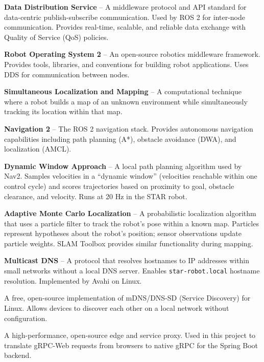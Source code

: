 \documentclass[11pt,letterpaper]{article}
\begin{document}
\begin{description}[style=nextline, leftmargin=2cm]
    \item[DDS] \textbf{Data Distribution Service} -- A middleware protocol and API standard for data-centric publish-subscribe communication. Used by ROS 2 for inter-node communication. Provides real-time, scalable, and reliable data exchange with Quality of Service (QoS) policies.

    \item[ROS 2] \textbf{Robot Operating System 2} -- An open-source robotics middleware framework. Provides tools, libraries, and conventions for building robot applications. Uses DDS for communication between nodes.

    \item[SLAM] \textbf{Simultaneous Localization and Mapping} -- A computational technique where a robot builds a map of an unknown environment while simultaneously tracking its location within that map.

    \item[Nav2] \textbf{Navigation 2} -- The ROS 2 navigation stack. Provides autonomous navigation capabilities including path planning (A*), obstacle avoidance (DWA), and localization (AMCL).

    \item[DWA] \textbf{Dynamic Window Approach} -- A local path planning algorithm used by Nav2. Samples velocities in a ``dynamic window'' (velocities reachable within one control cycle) and scores trajectories based on proximity to goal, obstacle clearance, and velocity. Runs at 20 Hz in the STAR robot.

    \item[AMCL] \textbf{Adaptive Monte Carlo Localization} -- A probabilistic localization algorithm that uses a particle filter to track the robot's pose within a known map. Particles represent hypotheses about the robot's position; sensor observations update particle weights. SLAM Toolbox provides similar functionality during mapping.

    \item[mDNS] \textbf{Multicast DNS} -- A protocol that resolves hostnames to IP addresses within small networks without a local DNS server. Enables \texttt{star-robot.local} hostname resolution. Implemented by Avahi on Linux.

    \item[Avahi] A free, open-source implementation of mDNS/DNS-SD (Service Discovery) for Linux. Allows devices to discover each other on a local network without configuration.

    \item[Envoy] A high-performance, open-source edge and service proxy. Used in this project to translate gRPC-Web requests from browsers to native gRPC for the Spring Boot backend.
\end{description}
\end{document}
